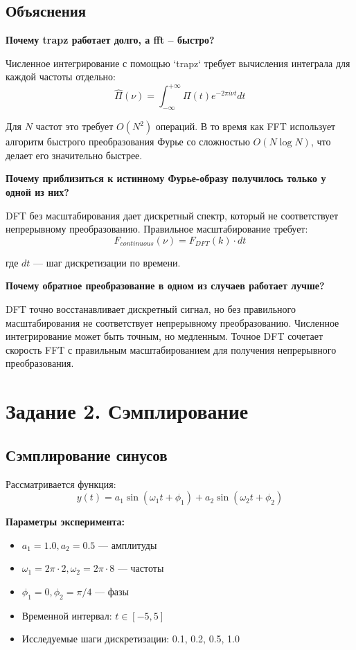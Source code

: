 \subsection*{Объяснения}

\textbf{Почему trapz работает долго, а fft – быстро?}

Численное интегрирование с помощью `trapz` требует вычисления интеграла для каждой частоты отдельно:
\begin{equation}
\hat{\Pi}(\nu) = \int_{-\infty}^{+\infty} \Pi(t) e^{-2\pi i \nu t} dt
\end{equation}

Для $N$ частот это требует $O(N^2)$ операций. В то время как FFT использует алгоритм быстрого преобразования Фурье со сложностью $O(N \log N)$, что делает его значительно быстрее.

\textbf{Почему приблизиться к истинному Фурье-образу получилось только у одной из них?}

DFT без масштабирования дает дискретный спектр, который не соответствует непрерывному преобразованию. Правильное масштабирование требует:
\begin{equation}
F_{continuous}(\nu) = F_{DFT}(k) \cdot dt
\end{equation}

где $dt$ — шаг дискретизации по времени.

\textbf{Почему обратное преобразование в одном из случаев работает лучше?}

DFT точно восстанавливает дискретный сигнал, но без правильного масштабирования не соответствует непрерывному преобразованию. Численное интегрирование может быть точным, но медленным. Точное DFT сочетает скорость FFT с правильным масштабированием для получения непрерывного преобразования.

\section*{Задание 2. Сэмплирование}

\subsection*{Сэмплирование синусов}

Рассматривается функция:
\begin{equation}
y(t) = a_1 \sin(\omega_1 t + \phi_1) + a_2 \sin(\omega_2 t + \phi_2)
\end{equation}

\textbf{Параметры эксперимента:}
\begin{itemize}
    \item $a_1 = 1.0, a_2 = 0.5$ — амплитуды
    \item $\omega_1 = 2\pi \cdot 2, \omega_2 = 2\pi \cdot 8$ — частоты
    \item $\phi_1 = 0, \phi_2 = \pi/4$ — фазы
    \item Временной интервал: $t \in [-5, 5]$
    \item Исследуемые шаги дискретизации: 0.1, 0.2, 0.5, 1.0
\end{itemize}

